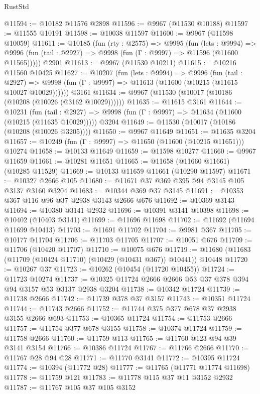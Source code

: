 \begin{lexlean}{RustStd}
\begin{coremodule}
@11594 := @10182 @11576 @2898
@11596 := @9967 (@11530 @10188)
@11597 := @11555 @10191
@11598 := @10038 @11597
@11600 := @9967 (@11598 @10059)
@11611 := @10185
    (fun (rty : @2575) =>
    @9995
      (fun (lets : @9994) =>
      @9996 (fun (tail : @2927) => @9998 (fun (Γ : @9997) => @11596 (@11600 @11565)))))
    @2901
@11613 := @9967 (@11530 @10211)
@11615 := @10216 @11560 @10425
@11627 := @10207
    (fun (lets : @9994) =>
    @9996
      (fun (tail : @2927) =>
      @9998 (fun (Γ : @9997) => @11613 (@11600 (@10215 (@11615 @10027 @10029))))))
    @3161
@11634 := @9967 (@11530 (@10017 (@10186 (@10208 (@10026 (@3162 @10029))))))
@11635 := @11615 @3161
@11644 := @10231
    (fun (tail : @2927) => @9998 (fun (Γ : @9997) => @11634 (@11600 (@10215 (@11635 @10029)))))
    @3204
@11649 := @11530 (@10017 (@10186 (@10208 (@10026 @3205))))
@11650 := @9967 @11649
@11651 := @11635 @3204
@11657 := @10249 (fun (Γ : @9997) => @11650 (@11600 (@10215 @11651))) @10274
@11658 := @10133 @11649
@11659 := @11598 @10277
@11660 := @9967 @11659
@11661 := @10281 @11651
@11665 := @11658 (@11660 @11661) (@10285 @11529)
@11669 := @10133 @11659 @11661 (@10290 @11597)
@11671 := @10327 @2666 @105
@11680 := @11671 @37 @369 @395 @94 @3145 @105 @3137 @3160 @3204
@11683 := @10344 @369 @37 @3145
@11691 := @10353 @367 @116 @96 @37 @2938 @3143 @2666 @676
@11692 := @10369 @3143
@11694 := @10380 @3141 @2932
@11696 := @10391 @3141 @10398
@11698 := @10402 (@10403 @3141)
@11699 := @11696 @11698
@11702 := @11692 (@11694 @11699 @10413)
@11703 := @11691 @11702
@11704 := @9981 @367
@11705 := @10177 @11704
@11706 := @11703 @11705
@11707 := @10051 @676
@11709 := @11706 (@10420 @11707)
@11710 := @10075 @676
@11719 := @11680 (@11683 (@11709 (@10424 @11710) (@10429 (@10431 @367)) @10441)) @10448
@11720 := @10267 @37
@11723 := @10262 (@10454 (@11720 @10455))
@11724 := @11723 @10274
@11737 := @10325 @11724 @2666 @2666 @53 @37 @378 @394 @94 @3157 @53 @3137 @2938 @3204
@11738 := @10342 @11724
@11739 := @11738 @2666
@11742 := @11739 @378 @37 @3157
@11743 := @10351 @11724
@11744 := @11743 @2666
@11752 := @11744 @375 @377 @678 @37 @2938 @3155 @2666 @693
@11753 := @10365 @11724
@11754 := @11753 @2666
@11757 := @11754 @377 @678 @3155
@11758 := @10374 @11724
@11759 := @11758 @2666
@11760 := @11759 @113
@11765 := @11760 @123 @94 @39 @3141 @3154
@11766 := @10386 @11724
@11767 := @11766 @2666
@11770 := @11767 @28 @94 @28
@11771 := @11770 @3141
@11772 := @10395 @11724
@11774 := @10394 (@11772 @28)
@11777 := @11765 (@11771 @11774 @11698)
@11778 := @11759 @121
@11783 := @11778 @115 @37 @11 @3152 @2932
@11787 := @11767 @105 @37 @105 @3152

\end{coremodule}
\end{lexlean}
